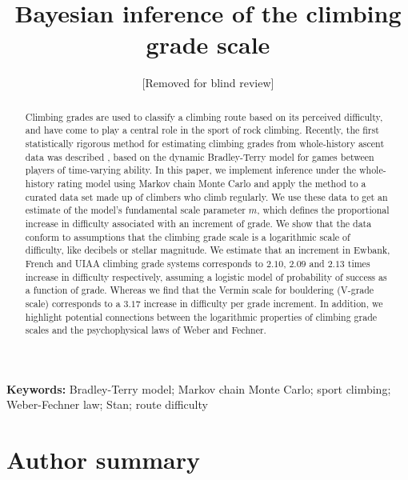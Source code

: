 \documentclass[12pt]{article}
\newcommand{\ewbankslope}{2.10}
\newcommand{\frenchslope}{2.09}
\newcommand{\uiaaslope}{2.13}
\newcommand{\verminslope}{3.17}
\begin{document}
\title{Bayesian inference of the climbing grade scale}

\author{[Removed for blind review]}

\date{}

\maketitle

\begin{abstract}
Climbing grades are used to classify a climbing route based on its perceived difficulty, and have come to play a central role in the sport of rock climbing. Recently, the first statistically rigorous method for estimating climbing grades from whole-history ascent data was described \citep{scarff2020estimation}, based on the dynamic Bradley-Terry model for games between players of time-varying ability. In this paper, we implement inference under the whole-history rating model using Markov chain Monte Carlo and apply the method to a curated data set made up of climbers who climb regularly. We use these data to get an estimate of the model's fundamental scale parameter $m$, which defines the proportional increase in difficulty associated with an increment of grade. We show that the data conform to assumptions that the climbing grade scale is a logarithmic scale of difficulty, like decibels or stellar magnitude. We estimate that an increment in Ewbank, French and UIAA climbing grade systems corresponds to $\ewbankslope{}$, $\frenchslope{}$ and $\uiaaslope$ times increase in difficulty respectively, assuming a logistic model of probability of success as a function of grade. Whereas we find that the Vermin scale for bouldering (V-grade scale) corresponds to a $\verminslope$ increase in difficulty per grade increment. In addition, we highlight potential connections between the logarithmic properties of climbing grade scales and the psychophysical laws of Weber and Fechner.
\end{abstract}

\noindent\textbf{Keywords:} Bradley-Terry model; Markov chain Monte Carlo; sport climbing; Weber-Fechner law; Stan; route difficulty

\section{Author summary}
\end{document}
